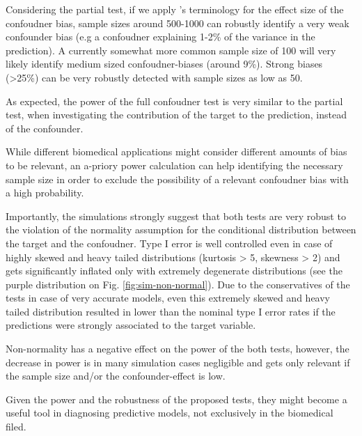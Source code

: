 \documentclass{article}
\begin{document}
Considering the partial test, if we apply \citeauthor{cohen2013statistical}'s terminology for the effect size of the confoudner bias, sample sizes around 500-1000 can robustly identify a very weak confounder bias (e.g a confoudner explaining 1-2\% of the variance in the prediction). A currently somewhat more common sample size of 100 will very likely identify medium sized confoudner-biases (around 9\%). Strong biases  (>25\%) can be very robustly detected with sample sizes as low as 50. 

As expected, the power of the full confoudner test is very similar to the partial test, when investigating the contribution of the target to the prediction, instead of the confounder.

While different biomedical applications might consider different amounts of bias to be relevant, an a-priory power calculation can help identifying the necessary sample size in order to exclude the possibility of a relevant confoudner bias with a high probability.

Importantly, the simulations strongly suggest that both tests are very robust to the violation of the normality assumption for the conditional distribution between the target and the confoudner. Type I error is well controlled even in case of highly skewed and heavy tailed distributions (kurtosis > 5, skewness > 2) and gets significantly inflated only with extremely degenerate distributions (see the purple distribution on Fig. \ref{fig:sim-non-normal}). Due to the conservatives of the tests in case of very accurate models, even this extremely skewed and heavy tailed distribution resulted in lower than the nominal type I error rates if the predictions were strongly associated to the target variable.

Non-normality has a negative effect on the power of the both tests, however, the decrease in power is in many simulation cases negligible and gets only relevant if the sample size and/or the confounder-effect is low.

Given the power and the robustness of the proposed tests, they might become a useful tool in diagnosing predictive models, not exclusively in the biomedical filed. 
\end{document}
